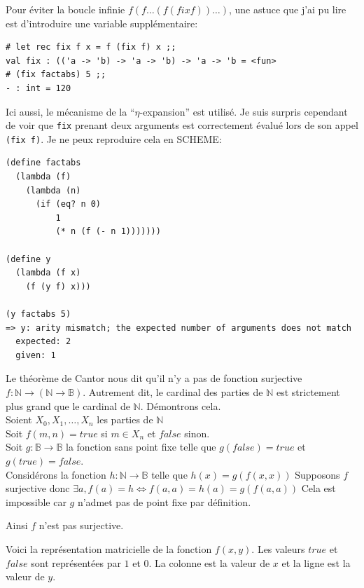 \documentclass[11pt]{book}
\begin{document}
Pour éviter la boucle infinie $f(f\ldots(f (fix f))\ldots)$, 
une astuce que j'ai pu lire est d'introduire une variable supplémentaire:

\begin{Verbatim}
# let rec fix f x = f (fix f) x ;;
val fix : (('a -> 'b) -> 'a -> 'b) -> 'a -> 'b = <fun>
# (fix factabs) 5 ;;
- : int = 120
\end{Verbatim}
Ici aussi, le mécanisme de la ``$\eta$-expansion'' est utilisé.
Je suis surpris cependant de voir que \verb+fix+ prenant deux arguments est correctement évalué lors de son appel \verb+(fix f)+.
Je ne peux reproduire cela en SCHEME:

\begin{Verbatim}
(define factabs
  (lambda (f)
    (lambda (n)
      (if (eq? n 0)
          1
          (* n (f (- n 1)))))))

(define y
  (lambda (f x)
    (f (y f) x)))

(y factabs 5)
=> y: arity mismatch; the expected number of arguments does not match 
  expected: 2
  given: 1
\end{Verbatim}

Le théorème de Cantor nous dit qu'il n'y a pas de fonction surjective 
$f: \mathbb{N} \rightarrow ( \mathbb{N} \rightarrow \mathbb{B}) $.
Autrement dit, le cardinal des parties de $\mathbb{N}$ est strictement plus grand que le cardinal de $\mathbb{N}$.
Démontrons cela. \\
Soient $X_0, X_1, \ldots, X_n$ les parties de $\mathbb{N}$  \\
Soit $f(m,n) = true$ si $m \in X_n$ et $false$ sinon. \\
Soit $g :\mathbb{B} \rightarrow \mathbb{B}$ la fonction sans point fixe telle que $g(false)=true$ et $g(true)=false$. \\
Considérons la fonction $h: \mathbb{N} \rightarrow \mathbb{B}$ telle que $h(x) = g(f(x,x))$
Supposons $f$ surjective donc $\exists a, f(a)= h \Leftrightarrow  f(a,a) = h(a) = g(f(a,a))$ 
Cela est impossible car $g$ n'admet pas de point fixe par définition.

Ainsi $f$ n'est pas surjective. \qedsymbol
\vspace{0.5cm}

Voici la représentation matricielle de la fonction $f(x,y)$. Les valeurs $true$ et $false$ sont représentées par $1$ et $0$.
La colonne est la valeur de $x$ et la ligne est la valeur de $y$.
\end{document}
